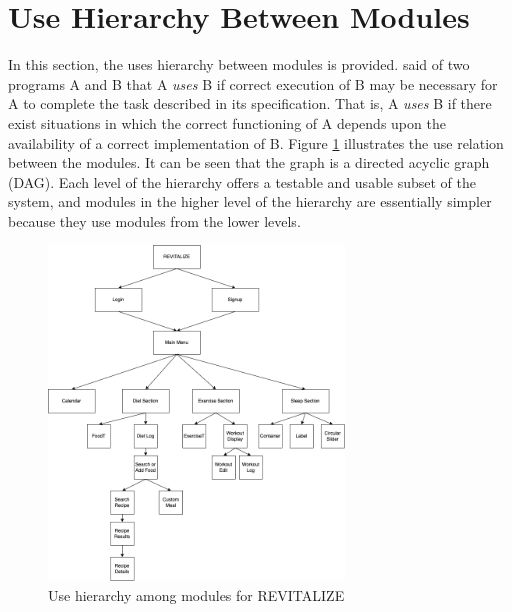 \documentclass[12pt, titlepage]{article}
\begin{document}
\section{Use Hierarchy Between Modules} \label{SecUse}

In this section, the uses hierarchy between modules is
provided. \citet{Parnas1978} said of two programs A and B that A {\em uses} B if
correct execution of B may be necessary for A to complete the task described in
its specification. That is, A {\em uses} B if there exist situations in which
the correct functioning of A depends upon the availability of a correct
implementation of B.  Figure \ref{FigUH} illustrates the use relation between
the modules. It can be seen that the graph is a directed acyclic graph
(DAG). Each level of the hierarchy offers a testable and usable subset of the
system, and modules in the higher level of the hierarchy are essentially simpler
because they use modules from the lower levels.

\begin{figure}[H]
	\centering
	\includegraphics[width=0.7\textwidth]{images/MGDAG.png}
	\caption{Use hierarchy among modules for REVITALIZE}
	\label{FigUH}
\end{figure}

\clearpage{\pagestyle{empty}\cleardoublepage}
\end{document}
